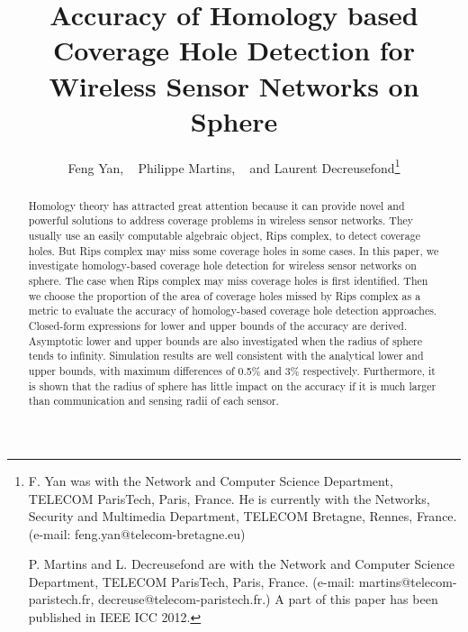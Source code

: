 \documentclass[journal, twoside]{IEEEtran}
\begin{document}
\title{Accuracy of Homology based Coverage Hole Detection for Wireless Sensor Networks on Sphere}


\author{Feng Yan, ~
        Philippe Martins, ~ and
        Laurent Decreusefond\thanks{F. Yan was with the Network and Computer Science Department, 
TELECOM ParisTech, Paris, France. He is currently with the Networks, Security and 
Multimedia Department, TELECOM Bretagne, Rennes, France. (e-mail: feng.yan@telecom-bretagne.eu) 

P. Martins and L. Decreusefond are with the Network 
and Computer Science Department, TELECOM ParisTech, Paris, France.
(e-mail: martins@telecom-paristech.fr, decreuse@telecom-paristech.fr.)
A part of this paper has been published in IEEE ICC 2012.}}



















\maketitle

\begin{abstract}
Homology theory has attracted great attention because it can provide novel
and powerful solutions to address coverage problems in wireless sensor networks. 
They usually use an easily computable algebraic object, Rips
complex, to detect coverage holes. But Rips complex may miss some coverage
holes in some cases. In this paper, we investigate homology-based coverage hole
detection for wireless sensor networks on sphere. The case when Rips complex
may miss coverage holes is first identified. Then we choose the proportion
of the area of coverage holes missed by Rips complex as a metric to evaluate
the accuracy of homology-based coverage hole detection approaches. Closed-form 
expressions for lower and upper bounds of the accuracy
are derived. Asymptotic lower and upper bounds are also investigated when the
radius of sphere tends to infinity. Simulation results are well consistent with the analytical
lower and upper bounds, with maximum differences of 0.5\% and 3\% respectively.
Furthermore, it is shown that the radius of sphere has little impact
on the accuracy if it is much larger than communication and sensing
radii of each sensor.
\end{abstract}
\end{document}

